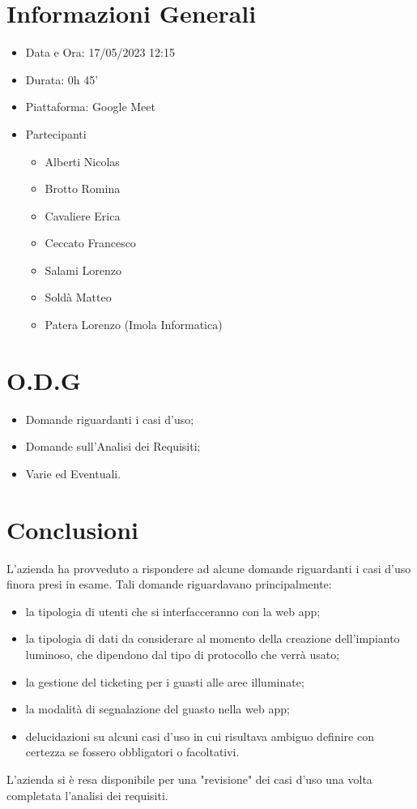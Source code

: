 \documentclass[a4paper, 12pt]{article}
\begin{document}
\makefrontpage
\section*{Informazioni Generali}
\begin{itemize}
    \item Data e Ora: 17/05/2023 12:15
    \item Durata: 0h 45'
    \item Piattaforma: Google Meet
    \item Partecipanti
    \begin{itemize}
        \item Alberti Nicolas
        \item Brotto Romina
        \item Cavaliere Erica
        \item Ceccato Francesco
        \item Salami Lorenzo
        \item Soldà Matteo
        \item Patera Lorenzo (Imola Informatica)
    \end{itemize}
\end{itemize}
\section*{O.D.G}
\begin{itemize}
    \item Domande riguardanti i casi d'uso;
    \item Domande sull'Analisi dei Requisiti;
    \item Varie ed Eventuali.
\end{itemize}
\section*{Conclusioni}
L'azienda ha provveduto a rispondere ad alcune domande riguardanti i casi d'uso finora presi in esame.
Tali domande riguardavano principalmente:
\begin{itemize}
    \item la tipologia di utenti che si interfacceranno con la web app;
    \item la tipologia di dati da considerare al momento della creazione dell'impianto luminoso, che dipendono dal tipo di protocollo che verrà usato;
    \item la gestione del ticketing per i guasti alle aree illuminate;
    \item la modalità di segnalazione del guasto nella web app;
    \item delucidazioni su alcuni casi d'uso in cui risultava ambiguo definire con certezza se fossero obbligatori o facoltativi.
\end{itemize}
L'azienda si è resa disponibile per una "revisione" dei casi d'uso una volta completata l'analisi dei requisiti.
\end{document}
